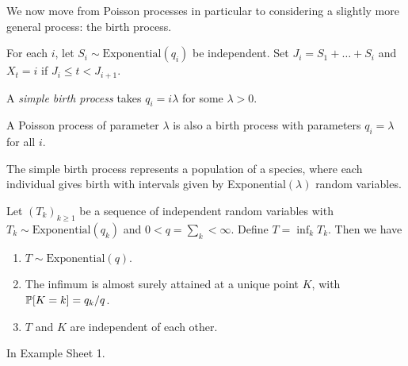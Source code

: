 \documentclass{article}
\begin{document}
We now move from Poisson processes in particular to considering a slightly more general process: the birth process.

\begin{definition}
    For each $i$, let $S_i \sim \mathrm{Exponential}(q_i)$ be independent. Set $J_i = S_1 + \dots + S_i$ and $X_t = i$ if $J_i \leq t < J_{i+1}$.
        
    A \textit{simple birth process} takes $q_i = i \lambda$ for some $\lambda > 0$.
\end{definition}

\begin{note}
	A Poisson process of parameter $\lambda$ is also a birth process with parameters $q_i = \lambda$ for all $i$.
\end{note}

\begin{note}
	The simple birth process represents a population of a species, where each individual gives birth with intervals given by Exponential$(\lambda)$ random variables.
\end{note}

\begin{proposition}[I]
    Let $(T_k)_{k \geq 1}$ be a sequence of independent random variables with $T_k \sim \mathrm{Exponential}(q_k)$ and $0 < q = \sum_{k} < \infty$. Define $T = \inf_k T_k$. Then we have
    \begin{enumerate}
    	\item $T \sim \mathrm{Exponential}(q)$.
    	\item The infimum is almost surely attained at a unique point $K$, with $\P[K = k] = q_k/q$.
    	\item $T$ and $K$ are independent of each other.
	\end{enumerate}
\end{proposition}
\begin{prf}
    In Example Sheet 1.
\end{prf}
\end{document}
